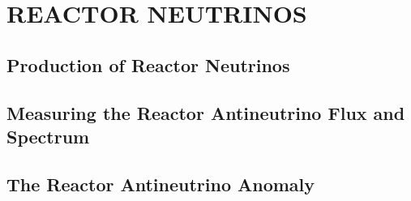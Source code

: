 \chapter{\uppercase{Reactor Neutrinos}}

\section{Production of Reactor Neutrinos}

\section{Measuring the Reactor Antineutrino Flux and Spectrum}

\section{The Reactor Antineutrino Anomaly}
